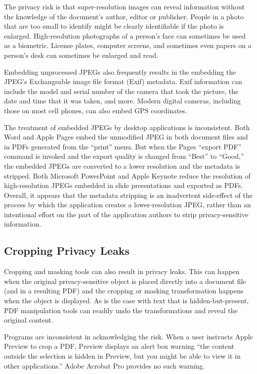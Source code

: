 The privacy risk is that super-resolution images can reveal information
without the knowledge of the document's author, editor or
publisher. People in a photo that are too small to identify might be
clearly identifiable if the photo is enlarged. High-resolution photographs of a
person's face can sometimes be used as a
biometric. License plates, computer screens, and sometimes even papers
on a person's desk can sometimes be enlarged and read. 

Embedding unprocessed JPEGs also frequently results in the
embedding the JPEG's Exchangeable image file format (Exif) metadata. Exif
information can include the model and serial number of the camera that
took the picture, the date and time that it was taken, and more. Modern digital cameras, including those on most
cell phones, can also embed GPS coordinates.

The treatment of embedded JPEGs by desktop applications is
inconsistent. Both Word and Apple Pages embed the
unmodified JPEG in both document files and in PDFs generated from the ``print''
menu. But when the Pages ``export PDF'' command is invoked and the export
quality is changed from ``Best'' to ``Good,'' the embedded
JPEGs are converted to a lower resolution and the metadata is stripped.
Both Microsoft PowerPoint and Apple Keynote reduce the resolution of
high-resolution JPEGs embedded in slide presentations and exported as
PDFs. Overall,  it appears that the metadata stripping is an
inadvertent side-effect of the process by which the application
creates a lower-resolution JPEG, rather than an intentional effort on
the part of the application authors to strip privacy-sensitive
information. 

\subsection{Cropping Privacy Leaks}

Cropping and masking tools can also result in privacy leaks. This can
happen when the original privacy-sensitive object is placed directly
into a document file (and in a resulting PDF) and the cropping or
masking transformation happens when the object is displayed. As is the
case with text that is hidden-but-present, PDF manipulation tools can
readily undo the transformations and reveal the original content.

Programs are inconsistent in acknowledging the risk. When a user
instructs Apple Preview to crop a PDF, Preview
displays an alert box warning ``the content outside the selection is
hidden in Preview, but you might be able to view it in other
applications.'' Adobe Acrobat Pro provides no such warning.


